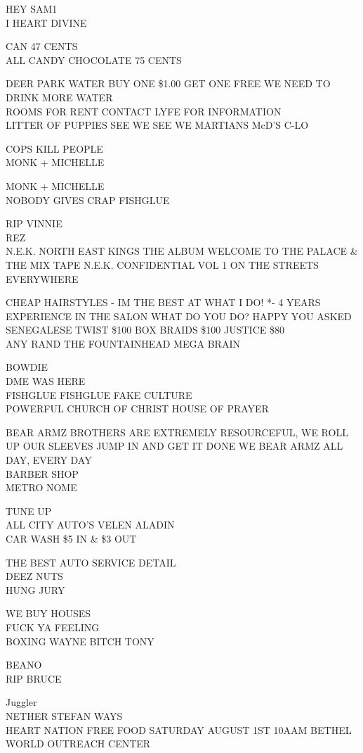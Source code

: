 \documentclass[10pt,letterpaper]{article}
\begin{document}
HEY SAM1\\
I HEART DIVINE

CAN 47 CENTS\\
ALL CANDY CHOCOLATE 75 CENTS

DEER PARK WATER BUY ONE \$1.00 GET ONE FREE WE NEED TO DRINK MORE WATER\\
ROOMS FOR RENT CONTACT LYFE FOR INFORMATION\\
LITTER OF PUPPIES SEE WE SEE WE MARTIANS McD'S C{-}LO

COPS KILL PEOPLE\\
MONK + MICHELLE

MONK + MICHELLE\\
NOBODY GIVES CRAP FISHGLUE

RIP VINNIE\\
REZ\\
N.E.K. NORTH EAST KINGS THE ALBUM WELCOME TO THE PALACE \& THE MIX TAPE N.E.K. CONFIDENTIAL VOL 1 ON THE STREETS EVERYWHERE

CHEAP HAIRSTYLES {-} IM THE BEST AT WHAT I DO!  *{-} 4 YEARS EXPERIENCE IN THE SALON WHAT DO YOU DO?  HAPPY YOU ASKED SENEGALESE TWIST \$100 BOX BRAIDS \$100 JUSTICE \$80\\
ANY RAND THE FOUNTAINHEAD MEGA BRAIN

BOWDIE\\
DME WAS HERE\\
FISHGLUE FISHGLUE FAKE CULTURE\\
POWERFUL CHURCH OF CHRIST HOUSE OF PRAYER

BEAR ARMZ BROTHERS ARE EXTREMELY RESOURCEFUL, WE ROLL UP OUR SLEEVES JUMP IN AND GET IT DONE WE BEAR ARMZ ALL DAY, EVERY DAY\\
BARBER SHOP\\
METRO NOME

TUNE UP\\
ALL CITY AUTO'S VELEN ALADIN\\
CAR WASH \$5 IN \& \$3 OUT

THE BEST AUTO SERVICE DETAIL\\
DEEZ NUTS\\
HUNG JURY

WE BUY HOUSES\\
FUCK YA FEELING\\
BOXING WAYNE BITCH TONY

BEANO\\
RIP BRUCE

Juggler\\
NETHER STEFAN WAYS\\
HEART NATION FREE FOOD SATURDAY AUGUST 1ST 10AAM BETHEL WORLD OUTREACH CENTER
\end{document}
